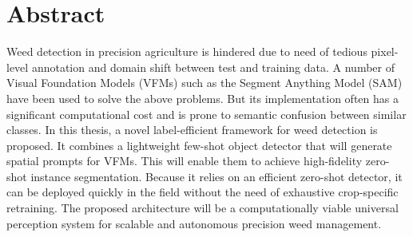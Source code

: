 \section{Abstract}

Weed detection in precision agriculture is hindered due to need of tedious pixel-level annotation and domain shift between test and training data. A number of Visual Foundation Models (VFMs) such as the Segment Anything Model (SAM) have been used to solve the above problems. But its implementation often has a significant computational cost and is prone to semantic confusion between similar classes. In this thesis, a novel label-efficient framework for weed detection is proposed. It combines a lightweight few-shot object detector that will generate spatial prompts for VFMs. This will enable them to achieve high-fidelity zero-shot instance segmentation. Because it relies on an efficient zero-shot detector, it can be deployed quickly in the field without the need of exhaustive crop-specific retraining. The proposed architecture will be a computationally viable  universal perception system for scalable and autonomous precision weed management.